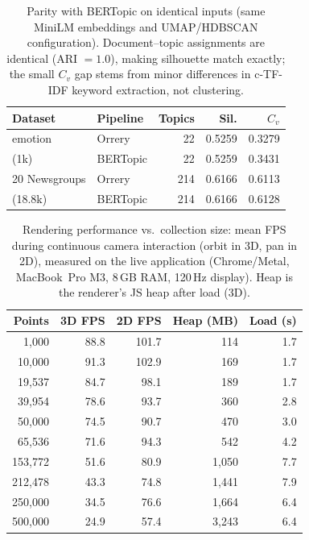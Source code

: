 \documentclass[11pt]{article}
\begin{document}

\clearpage

\appendix



\begin{table}[t]
\centering
\small
\setlength{\tabcolsep}{4pt}
\begin{tabular}{llrrr}
\toprule
Dataset & Pipeline & Topics & Sil. & $C_v$ \\
\midrule
emotion & Orrery   & 22 & 0.5259 & 0.3279 \\
(1k)    & BERTopic & 22 & 0.5259 & 0.3431 \\
\midrule
20 Newsgroups & Orrery   & 214 & 0.6166 & 0.6113 \\
(18.8k)       & BERTopic & 214 & 0.6166 & 0.6128 \\
\bottomrule
\end{tabular}
\caption{Parity with BERTopic on identical inputs (same MiniLM embeddings and
UMAP/HDBSCAN configuration). Document--topic assignments are identical (ARI $=1.0$), making silhouette match exactly; the small $C_v$ gap stems from minor differences in c-TF-IDF keyword extraction, not clustering.}
\label{tab:bertopic-parity}
\end{table}

\begin{table}[t]
\centering
\small
\begin{tabular}{rrrrr}
\toprule
Points & 3D FPS & 2D FPS & Heap (MB) & Load (s) \\
\midrule
1{,}000    & 88.8 & 101.7 & 114   & 1.7 \\
10{,}000   & 91.3 & 102.9 & 169   & 1.7 \\
19{,}537   & 84.7 &  98.1 & 189   & 1.7 \\
39{,}954   & 78.6 &  93.7 & 360   & 2.8 \\
50{,}000   & 74.5 &  90.7 & 470   & 3.0 \\
65{,}536   & 71.6 &  94.3 & 542   & 4.2 \\
153{,}772  & 51.6 &  80.9 & 1{,}050 & 7.7 \\
212{,}478  & 43.3 &  74.8 & 1{,}441 & 7.9 \\
250{,}000  & 34.5 &  76.6 & 1{,}664 & 6.4 \\
500{,}000  & 24.9 &  57.4 & 3{,}243 & 6.4 \\
\bottomrule
\end{tabular}
\caption{Rendering performance vs.\ collection size: mean FPS during continuous camera interaction (orbit in 3D, pan in 2D), measured on the live application (Chrome/Metal, MacBook~Pro M3, 8\,GB RAM, 120\,Hz display). Heap is
the renderer's JS heap after load (3D).}
\label{tab:fps}
\end{table}
\end{document}
